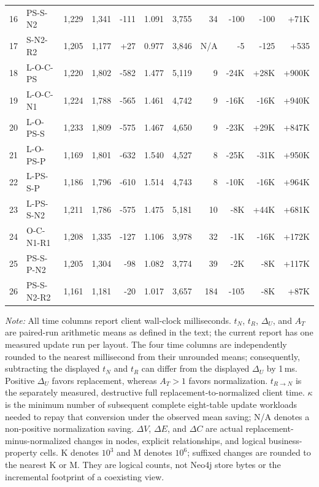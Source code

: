 \documentclass[sigconf]{acmart}
\begin{document}
\begin{table}[t]
{\begin{tabular}{rlrrrrrrrrr}
16 & PS-S-N2    & 1,229 & 1,341 &  -111 & 1.091 &   3,755 &    34 &   -100 &   -100 &  +71K \\
17 & S-N2-R2    & 1,205 & 1,177 &   +27 & 0.977 &   3,846 &   N/A &     -5 &   -125 &  +535 \\
18 & L-O-C-PS   & 1,220 & 1,802 &  -582 & 1.477 &   5,119 &     9 &   -24K &   +28K & +900K \\
19 & L-O-C-N1   & 1,224 & 1,788 &  -565 & 1.461 &   4,742 &     9 &   -16K &   -16K & +940K \\
20 & L-O-PS-S   & 1,233 & 1,809 &  -575 & 1.467 &   4,650 &     9 &   -23K &   +29K & +847K \\
21 & L-O-PS-P   & 1,169 & 1,801 &  -632 & 1.540 &   4,527 &     8 &   -25K &   -31K & +950K \\
22 & L-PS-S-P   & 1,186 & 1,796 &  -610 & 1.514 &   4,743 &     8 &   -10K &   -16K & +964K \\
23 & L-PS-S-N2  & 1,211 & 1,786 &  -575 & 1.475 &   5,181 &    10 &    -8K &   +44K & +681K \\
24 & O-C-N1-R1  & 1,208 & 1,335 &  -127 & 1.106 &   3,978 &    32 &    -1K &   -16K & +172K \\
25 & PS-S-P-N2  & 1,205 & 1,304 &   -98 & 1.082 &   3,774 &    39 &    -2K &    -8K & +117K \\
26 & PS-S-N2-R2 & 1,161 & 1,181 &   -20 & 1.017 &   3,657 &   184 &   -105 &    -8K &  +87K \\
\bottomrule
\end{tabular}
}
\textit{Note:} All time columns report client wall-clock milliseconds.
$t_N$, $t_R$, $\Delta_U$, and $A_T$ are paired-run arithmetic means as defined
in the text; the current report has one measured update run per layout. The
four time columns are independently rounded to the nearest
millisecond from their unrounded means; consequently, subtracting the displayed
$t_N$ and $t_R$ can differ from the displayed $\Delta_U$ by 1\,ms. Positive
$\Delta_U$ favors replacement, whereas $A_T>1$ favors normalization.
$t_{R\rightarrow N}$ is the separately measured, destructive
full replacement-to-normalized client time. $\kappa$ is the minimum number of
subsequent complete eight-table update workloads needed to repay that
conversion under the observed mean saving; N/A denotes a non-positive
normalization saving. $\Delta V$, $\Delta E$, and $\Delta C$ are actual
replacement-minus-normalized changes in nodes, explicit relationships, and
logical business-property cells. K denotes $10^3$ and M denotes $10^6$;
suffixed changes are rounded to the nearest K or M. They are logical counts,
not Neo4j store bytes or the incremental footprint of a coexisting view.
\end{table}
\end{document}
